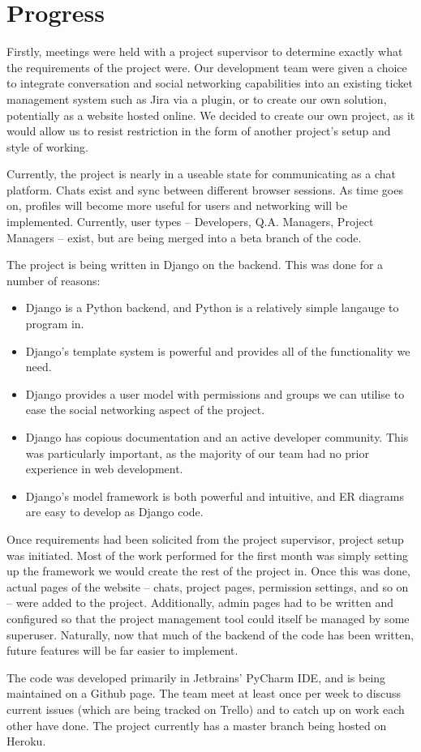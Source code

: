 \documentclass[draft, 10pt]{article}
\begin{document}
\section{Progress} \par
Firstly, meetings were held with a project supervisor to determine exactly what the requirements of the project were. Our development team were given a choice to integrate conversation and social networking capabilities into an existing ticket management system such as Jira via a plugin, or to create our own solution, potentially as a website hosted online. We decided to create our own project, as it would allow us to resist restriction in the form of another project's setup and style of working. \par
Currently, the project is nearly in a useable state for communicating as a chat platform. Chats exist and sync between different browser sessions. As time goes on, profiles will become more useful for users and networking will be implemented. Currently, user types -- Developers, Q.A. Managers, Project Managers -- exist, but are being merged into a beta branch of the code. \par 
The project is being written in Django on the backend. This was done for a number of reasons:
\begin{itemize} 
\item Django is a Python backend, and Python is a relatively simple langauge to program in. 
\item Django's template system is powerful and provides all of the functionality we need.
\item Django provides a user model with permissions and groups we can utilise to ease the social networking aspect of the project.
\item Django has copious documentation and an active developer community. This was particularly important, as the majority of our team had no prior experience in web development.
\item Django's model framework is both powerful and intuitive, and ER diagrams are easy to develop as Django code. 
\end{itemize} \par
Once requirements had been solicited from the project supervisor, project setup was initiated. Most of the work performed for the first month was simply setting up the framework we would create the rest of the project in. Once this was done, actual pages of the website -- chats, project pages, permission settings, and so on -- were added to the project. Additionally, admin pages had to be written and configured so that the project management tool could itself be managed by some superuser. Naturally, now that much of the backend of the code has been written, future features will be far easier to implement. \par
The code was developed primarily in Jetbrains' PyCharm IDE, and is being maintained on a Github page. The team meet at least once per week to discuss current issues (which are being tracked on Trello) and to catch up on work each other have done. The project currently has a master branch being hosted on Heroku.\par 
\end{document}
